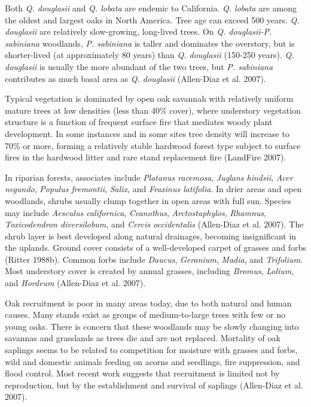 Both \emph{Q. douglasii} and \emph{Q. lobata} are endemic to California. \emph{Q. lobata} are among the oldest and largest oaks in North America. Tree age can exceed 500 years. \emph{Q. douglasii} are relatively slow-growing, long-lived trees. On \emph{Q. douglasii-P. sabiniana} woodlands, \emph{P. sabiniana} is taller and dominates the overstory, but is shorter-lived (at approximately 80 years) than \emph{Q. douglasii} (150-250 years). \emph{Q. douglasii} is usually the more abundant of the two trees, but \emph{P. sabiniana} contributes as much basal area as \emph{Q. douglasii} (Allen-Diaz et al. 2007).

Typical vegetation is dominated by open oak savannah with relatively uniform mature trees at low densities (less than 40\% cover), where understory vegetation structure is a function of frequent surface fire that mediates woody plant development. In some instances and in some sites tree density will increase to 70\% or more, forming a relatively stable hardwood forest type subject to surface fires in the hardwood litter and rare stand replacement fire (LandFire 2007).

In riparian forests, associates include \emph{Platanus racemosa}, \emph{Juglans hindsii}, \emph{Acer negundo}, \emph{Populus fremontii}, \emph{Salix}, and \emph{Fraxinus latifolia}. In drier areas and open woodlands, shrubs usually clump together in open areas with full sun. Species may include \emph{Aesculus californica}, \emph{Ceanothus}, \emph{Arctostaphylos}, \emph{Rhamnus}, \emph{Toxicodendron diversilobum}, and \emph{Cercis occidentalis} (Allen-Diaz et al. 2007). The shrub layer is best developed along natural drainages, becoming insignificant in the uplands. Ground cover consists of a well-developed carpet of grasses and forbs (Ritter 1988b). Common forbs include \emph{Daucus}, \emph{Geranium}, \emph{Madia}, and \emph{Trifolium}. Most understory cover is created by annual grasses, including \emph{Bromus}, \emph{Lolium}, and \emph{Hordeum} (Allen-Diaz et al. 2007).

Oak recruitment is poor in many areas today, due to both natural and human causes. Many stands exist as groups of medium-to-large trees with few or no young oaks. There is concern that these woodlands may be slowly changing into savannas and grasslands as trees die and are not replaced. Mortality of oak saplings seems to be related to competition for moisture with grasses and forbs, wild and domestic animals feeding on acorns and seedlings, fire suppression, and flood control. Most recent work suggests that recruitment is limited not by reproduction, but by the establishment and survival of saplings (Allen-Diaz et al. 2007).



